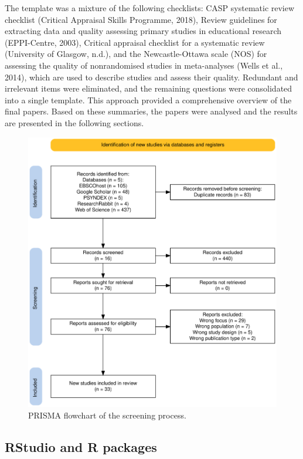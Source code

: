 \documentclass[
  stu,floatsintext]{apa7}
\begin{document}
The template was a mixture of the following checklists: CASP systematic review checklist (Critical Appraisal Skills Programme, 2018), Review guidelines for extracting data and quality assessing primary studies in educational research (EPPI-Centre, 2003), Critical appraisal checklist for a systematic review (University of Glasgow, n.d.), and the Newcastle-Ottawa scale (NOS) for assessing the quality of nonrandomised studies in meta-analyses (Wells et al., 2014), which are used to describe studies and assess their quality.
Redundant and irrelevant items were eliminated, and the remaining questions were consolidated into a single template.
This approach provided a comprehensive overview of the final papers.
Based on these summaries, the papers were analysed and the results are presented in the following sections.

\begin{figure}
\centering
\includegraphics{files/prisma.pdf}
\caption{\label{fig:prisma}PRISMA flowchart of the screening process.}
\end{figure}

\subsection{RStudio and R packages}\label{rstudio-and-r-packages}
\end{document}
